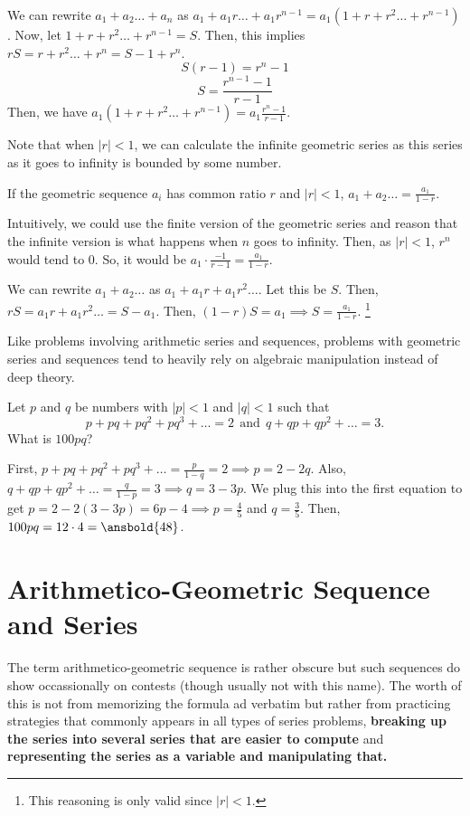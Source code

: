 \documentclass[11pt][mast]{lucky}
\begin{document}
\begin{pro}
We can rewrite $a_{1}+a_{2}\ldots + a_{n}$ as $a_{1}+a_{1}r\ldots + a_{1}r^{n-1}=a_{1}(1+r+r^2\ldots + r^{n-1})$. Now, let $1+r+r^2\ldots + r^{n-1}=S$. Then, this implies $rS=r+r^2\ldots + r^{n}=S-1+r^{n}$.
$$S(r-1)=r^{n}-1$$
$$S=\frac{r^{n-1}-1}{r-1}$$
Then, we have $a_{1}(1+r+r^2\ldots + r^{n-1})=a_{1}\frac{r^{n}-1}{r-1}$.
\end{pro}

Note that when $|r|<1$, we can calculate the infinite geometric series as this series as it goes to infinity is bounded by some number.
\begin{theo}
If the geometric sequence $a_{i}$ has common ratio $r$ and $|r|<1$, $a_{1}+a_{2}\ldots = \frac{a_{1}}{1-r}$.
\end{theo}

Intuitively, we could use the finite version of the geometric series and reason that the infinite version is what happens when $n$ goes to infinity. Then, as $|r|<1$, $r^{n}$ would tend to $0$. So, it would be $a_{1}\cdot \frac{-1}{r-1}=\frac{a_{1}}{1-r}$.

\begin{pro}
We can rewrite $a_{1}+a_{2}\ldots $ as $a_{1}+a_{1}r+a_{1}r^2\ldots$. Let this be $S$. Then, $rS=a_{1}r+a_{1}r^2\ldots = S-a_{1}$. Then, $(1-r)S=a_{1}\implies S =\frac{a_{1}}{1-r}$. \footnote{This reasoning is only valid since $|r|<1$.}
\end{pro}

Like problems involving arithmetic series and sequences, problems with geometric series and sequences tend to heavily rely on algebraic manipulation instead of deep theory.
\begin{exam}
Let $p$ and $q$ be numbers with  $|p| <1$ and $|q| <1$ such that \[p+pq+pq^2+pq^3 + \dots = 2  ~~\text{and} ~~ q + qp + qp^2 + \dots = 3.\] What is $100pq$?
\end{exam}

\begin{sol}
First, $p+pq+pq^2+pq^3 + \dots = \frac{p}{1-q}=2\implies p=2-2q$. Also, $q+qp+qp^2 + \dots = \frac{q}{1-p}=3\implies q=3-3p$. We plug this into the first equation to get $p=2-2(3-3p)=6p-4\implies p = \frac{4}{5}$ and $q=\frac{3}{5}$. Then, $100pq=12\cdot 4=\ansbold{48}$.
\end{sol}

\section{Arithmetico-Geometric Sequence and Series}
The term arithmetico-geometric sequence is rather obscure but such sequences do show occassionally on contests (though usually not with this name). The worth of this is not from memorizing the formula ad verbatim but rather from practicing strategies that commonly appears in all types of series problems, \textbf{breaking up the series into several series that are easier to compute} and \textbf{representing the series as a variable and manipulating that.}
\end{document}
